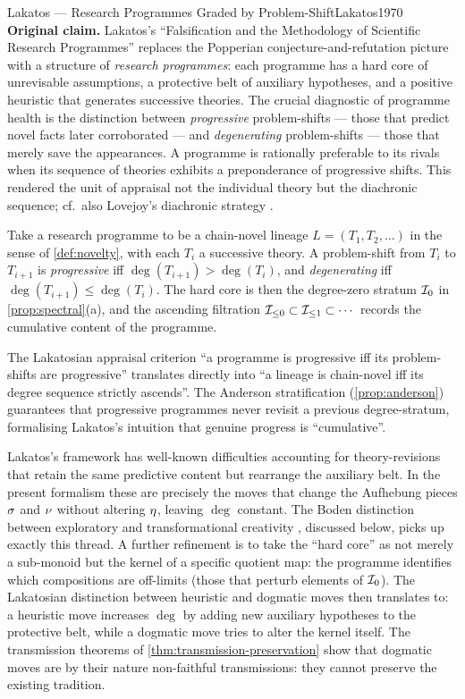 \begin{zooentry}{Lakatos --- Research Programmes Graded by Problem-Shift}{Lakatos1970}
\textbf{Original claim.} Lakatos's ``Falsification and the Methodology
of Scientific Research Programmes'' \cite{Lakatos1970} replaces the
Popperian conjecture-and-refutation picture with a structure of
\emph{research programmes}: each programme has a hard core of
unrevisable assumptions, a protective belt of auxiliary hypotheses,
and a positive heuristic that generates successive theories. The
crucial diagnostic of programme health is the distinction between
\emph{progressive} problem-shifts --- those that predict novel facts
later corroborated --- and \emph{degenerating} problem-shifts ---
those that merely save the appearances. A programme is rationally
preferable to its rivals when its sequence of theories exhibits a
preponderance of progressive shifts. This rendered the unit of
appraisal not the individual theory but the diachronic sequence; cf.\
also Lovejoy's diachronic strategy \cite{Lovejoy1936}.

\formalclaim Take a research programme to be a chain-novel lineage
$L = (T_1, T_2, \dots)$ in the sense of \cref{def:novelty}, with each
$T_i$ a successive theory. A problem-shift from $T_i$ to $T_{i+1}$ is
\emph{progressive} iff $\deg(T_{i+1}) > \deg(T_i)$, and
\emph{degenerating} iff $\deg(T_{i+1}) \le \deg(T_i)$. The hard core
is then the degree-zero stratum $\mathcal{I}_0$ in
\cref{prop:spectral}(a), and the ascending filtration
$\mathcal{I}_{\le 0}\subset \mathcal{I}_{\le 1}\subset\cdots$ records
the cumulative content of the programme.

\formalstatus The Lakatosian appraisal criterion ``a programme is
progressive iff its problem-shifts are progressive'' translates
directly into ``a lineage is chain-novel iff its degree sequence
strictly ascends''. The Anderson stratification
(\cref{prop:anderson}) guarantees that progressive programmes never
revisit a previous degree-stratum, formalising Lakatos's intuition
that genuine progress is ``cumulative''.

\litcomment Lakatos's framework has well-known difficulties accounting
for theory-revisions that retain the same predictive content but
rearrange the auxiliary belt. In the present formalism these are
precisely the moves that change the Aufhebung pieces $\sigma$ and
$\nu$ without altering $\eta$, leaving $\deg$ constant. The
Boden distinction between exploratory and transformational creativity
\cite{Boden2004}, discussed below, picks up exactly this thread.
A further refinement is to take the ``hard core'' as not merely a
sub-monoid but the kernel of a specific quotient map: the programme
identifies which compositions are off-limits (those that perturb
elements of $\mathcal{I}_0$). The Lakatosian distinction between heuristic
and dogmatic moves then translates to: a heuristic move increases
$\deg$ by adding new auxiliary hypotheses to the protective belt, while
a dogmatic move tries to alter the kernel itself. The transmission
theorems of \cref{thm:transmission-preservation} show that dogmatic
moves are by their nature non-faithful transmissions: they cannot
preserve the existing tradition.
\end{zooentry}

